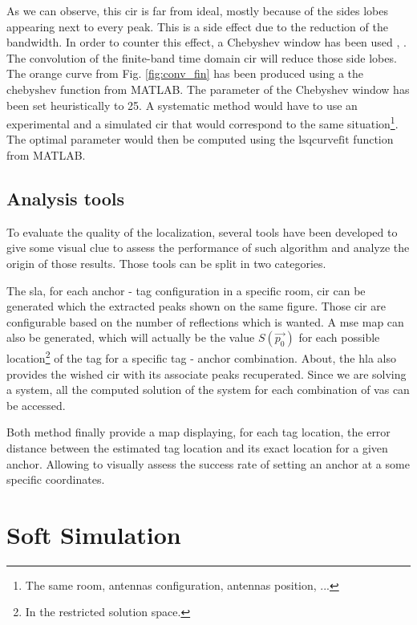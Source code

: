 As we can observe, this \gls{cir} is far from ideal, mostly because of the sides lobes appearing next to every peak. This is a side effect due to the reduction of the bandwidth. In order to counter this effect, a Chebyshev window has been used \cite{lynch1997dolph}, \cite{mathworks}. The convolution of the finite-band time domain \gls{cir} will reduce those side lobes. The orange curve from Fig. \ref{fig:conv_fin} has been produced using a the $\text{chebyshev}$ function from MATLAB. The parameter of the Chebyshev window has been set heuristically to 25. A systematic method would have to use an experimental and a simulated \gls{cir} that would correspond to the same situation\footnote{The same room, antennas configuration, antennas position, ...}. The optimal parameter would then be computed using the $\text{lsqcurvefit}$ function from MATLAB.

\subsection{Analysis tools}

To evaluate the quality of the localization, several tools have been developed to give some visual clue to assess the performance of such algorithm and analyze the origin of those results. Those tools can be split in two categories.
\vspace{2mm}

The \gls{sla}, for each anchor - tag configuration in a specific room, \gls{cir} can be generated which the extracted peaks shown on the same figure. Those \gls{cir} are configurable based on the number of reflections which is wanted. A \gls{mse} map can also be generated, which will actually be the value $S(\vec{p_0})$ for each possible location\footnote{In the restricted solution space.} of the tag for a specific tag - anchor combination. About, the \gls{hla} also provides the wished \gls{cir} with its associate peaks recuperated. Since we are solving a system, all the computed solution of the system for each combination of \glspl{va} can be accessed. 
\vspace{2mm}

Both method finally provide a map displaying, for each tag location, the error distance between the estimated tag location and its exact location for a given anchor. Allowing to visually assess the success rate of setting an anchor at a some specific coordinates.

\section{Soft Simulation}

